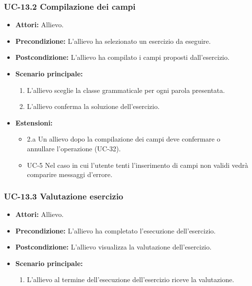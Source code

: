 	\subsubsection{UC-13.2 Compilazione dei campi}
		\begin{itemize}
			\item \textbf{Attori:} Allievo.
			\item \textbf{Precondizione:} L'allievo ha selezionato un esercizio da eseguire.
			\item \textbf{Postcondizione:} L'allievo ha compilato i campi proposti dall'esercizio.
			\item \textbf{Scenario principale:}
				\begin{enumerate}
					\item L'allievo sceglie la classe grammaticale per ogni parola presentata.
					\item L'allievo conferma la soluzione dell'esercizio.
				\end{enumerate}
			\item \textbf{Estensioni:} 
				\begin{itemize}
					\item 2.a Un allievo dopo la compilazione dei campi deve confermare o annullare l'operazione (UC-32).
					\item UC-5 Nel caso in cui l'utente tenti l'inserimento di campi non validi vedrà comparire messaggi d'errore.
				\end{itemize}
		\end{itemize}

	\subsubsection{UC-13.3 Valutazione esercizio}
	\begin{itemize}
			\item \textbf{Attori:} Allievo.
			\item \textbf{Precondizione:} L'allievo ha completato l'esecuzione dell'esercizio.
			\item \textbf{Postcondizione:} L'allievo visualizza la valutazione dell'esercizio.
			\item \textbf{Scenario principale:}
				\begin{enumerate}
					\item L'allievo al termine dell'esecuzione dell'esercizio riceve la valutazione.
				\end{enumerate}
			\end{itemize}
			
